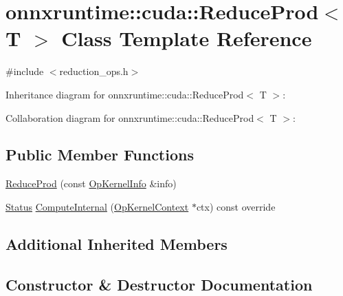 \hypertarget{classonnxruntime_1_1cuda_1_1ReduceProd}{}\section{onnxruntime\+:\+:cuda\+:\+:Reduce\+Prod$<$ T $>$ Class Template Reference}
\label{classonnxruntime_1_1cuda_1_1ReduceProd}


{\ttfamily \#include $<$reduction\+\_\+ops.\+h$>$}



Inheritance diagram for onnxruntime\+:\+:cuda\+:\+:Reduce\+Prod$<$ T $>$\+:


Collaboration diagram for onnxruntime\+:\+:cuda\+:\+:Reduce\+Prod$<$ T $>$\+:
\subsection*{Public Member Functions}
\begin{DoxyCompactItemize}
\item 
\mbox{\hyperlink{classonnxruntime_1_1cuda_1_1ReduceProd_a6948bd6caef02b2180a47abce1f6b577}{Reduce\+Prod}} (const \mbox{\hyperlink{classonnxruntime_1_1OpKernelInfo}{Op\+Kernel\+Info}} \&info)
\item 
\mbox{\hyperlink{classonnxruntime_1_1common_1_1Status}{Status}} \mbox{\hyperlink{classonnxruntime_1_1cuda_1_1ReduceProd_a730e4b8b638b52810b8e50ed11e7d7fe}{Compute\+Internal}} (\mbox{\hyperlink{classonnxruntime_1_1OpKernelContext}{Op\+Kernel\+Context}} $\ast$ctx) const override
\end{DoxyCompactItemize}
\subsection*{Additional Inherited Members}


\subsection{Constructor \& Destructor Documentation}
\mbox{\label{classonnxruntime_1_1cuda_1_1ReduceProd_a6948bd6caef02b2180a47abce1f6b577}} 
